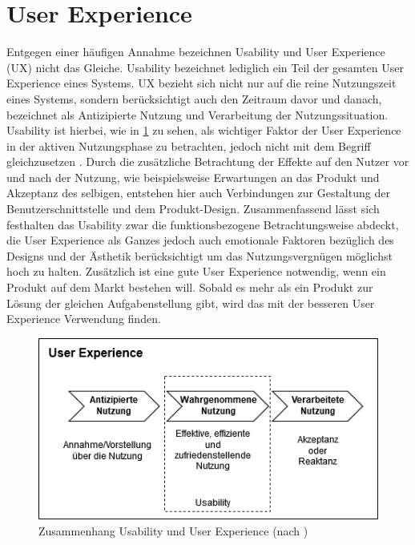 \section{User Experience}
Entgegen einer häufigen Annahme bezeichnen Usability und User Experience (UX) nicht das Gleiche.
Usability bezeichnet lediglich ein Teil der gesamten User Experience eines Systems\cite{Knight.2019c}.
UX bezieht sich nicht nur auf die reine Nutzungszeit eines Systems, sondern berücksichtigt auch den Zeitraum davor und danach, bezeichnet als Antizipierte Nutzung und Verarbeitung der Nutzungssituation.
Usability ist hierbei, wie in \cref{fig:UX} zu sehen, als wichtiger Faktor der User Experience in der aktiven Nutzungsphase zu betrachten, jedoch nicht mit dem Begriff gleichzusetzen \cite{Sarodnick.2016}.
Durch die zusätzliche Betrachtung der Effekte auf den Nutzer vor und nach der Nutzung, wie beispielsweise Erwartungen an das Produkt und Akzeptanz des selbigen, entstehen hier auch Verbindungen zur Gestaltung der Benutzerschnittstelle und dem Produkt-Design\cite{Richter.2016}.
Zusammenfassend lässt sich festhalten das Usability zwar die funktionsbezogene Betrachtungsweise abdeckt, die User Experience als Ganzes jedoch auch emotionale Faktoren bezüglich des Designs und der Ästhetik berücksichtigt um das Nutzungsvergnügen möglichst hoch zu halten.
Zusätzlich ist eine gute User Experience notwendig, wenn ein Produkt auf dem Markt bestehen will.
Sobald es mehr als ein Produkt zur Lösung der gleichen Aufgabenstellung gibt, wird das mit der besseren User Experience Verwendung finden\cite{Knight.2019c}.


\begin{figure}[H]
\begin{center}
  \includegraphics[scale=0.6]{figures/UX.png}
  \caption{Zusammenhang Usability und User Experience (nach \cite{Sarodnick.2016})}
  \label{fig:UX}
\end{center}
\end{figure}

